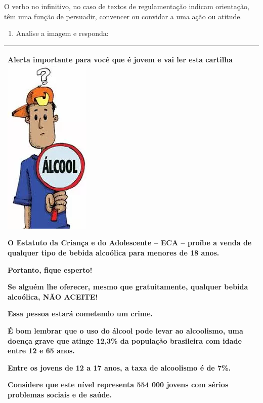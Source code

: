 {O verbo no infinitivo, no caso de textos de regulamentação indicam
orientação, têm uma função de persuadir, convencer ou convidar a uma
ação ou atitude.

\begin{enumerate}
\def\labelenumi{\arabic{enumi})}
\setcounter{enumi}{5}
\tightlist
\item
  Analise a imagem e responda:
\end{enumerate}

\begin{longtable}[]{@{}
  >{\raggedright\arraybackslash}p{}@{}}
\toprule
\endhead
\textbf{Alerta importante para você que é jovem e vai ler esta
cartilha}\includegraphics[width=1.625in,height=3.36458in]{./imgSAEB_7_POR/media/image2.png}

O Estatuto da Criança e do Adolescente -- ECA -- proíbe a venda de
qualquer tipo de bebida alcoólica para menores de 18 anos.

Portanto, fique esperto!

Se alguém lhe oferecer, mesmo que gratuitamente, qualquer bebida
alcoólica, NÃO ACEITE!

Essa pessoa estará cometendo um crime.

É bom lembrar que o uso do álcool pode levar ao alcoolismo, uma doença
grave que atinge 12,3\% da população brasileira com idade entre 12 e 65
anos.

Entre os jovens de 12 a 17 anos, a taxa de alcoolismo é de 7\%.

Considere que este nível representa 554 000 jovens com sérios problemas
sociais e de saúde. \\
\bottomrule
\end{longtable}

}
